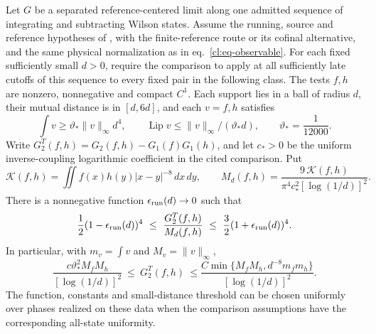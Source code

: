 \documentclass[11pt,letterpaper,reqno]{amsart}
\makeatletter
\numberwithin{equation}{section}
\renewcommand{\eqref}[1]{\textup{eq.~\ref{#1}}}
\theoremstyle{definition}
\newcommand{\ms@majorstart}{%
  \pushQED{\qed}\renewcommand{\qedsymbol}{$\blacksquare\square$}}
\newenvironment{corollary}[1][]{\ms@majorstart\ms@corollary[#1]}
  {\popQED\endms@corollary}
\theoremstyle{remark}
\makeatother
\begin{document}
\begin{corollary}[The closed physical shape law]
\label{cl:cor-shape-law}
Let \(G\) be a separated reference-centered limit along
one admitted sequence of integrating and subtracting Wilson
states. Assume the running, source and reference hypotheses of
\cite[Theorem~A and Corollaries~6.5 and~7.1]{FP}, with the
finite-reference route or its cofinal alternative, and the same
physical normalization as in \eqref{cl:eq-observable}.
For each fixed sufficiently small \(d>0\), require the comparison
to apply at all sufficiently late cutoffs of this sequence to
every fixed pair in the following class. The tests \(f,h\) are
nonzero, nonnegative and compact \(C^1\). Each support lies in a
ball of radius \(d\), their mutual distance is in \([d,6d]\), and
each \(v=f,h\) satisfies
\[
 \int v\ge\vartheta_*\|v\|_\infty d^4,\qquad
 \operatorname{Lip}v\le\|v\|_\infty/(\vartheta_*d),
 \qquad \vartheta_*=\frac1{12000}.
\]
Write \(G_2^T(f,h)=G_2(f,h)-G_1(f)G_1(h)\), and let \(c_*>0\)
be the uniform inverse-coupling logarithmic coefficient in the cited comparison.
Put
\[
 \mathcal K(f,h)=\iint f(x)h(y)|x-y|^{-8}\,dx\,dy,
 \qquad
 M_d(f,h)=\frac{9\,\mathcal K(f,h)}
                 {\pi^4 c_*^2[\log(1/d)]^2}.
\]
There is a nonnegative function \(\epsilon_{\rm run}(d)\to0\)
such that
\begin{equation}\label{cl:eq-shape-envelope}
 \frac12(1-\epsilon_{\rm run}(d))^4
 \ \le\ \frac{G_2^T(f,h)}{M_d(f,h)}
 \ \le\ \frac32(1+\epsilon_{\rm run}(d))^4 .
\end{equation}
In particular, with \(m_v=\int v\) and \(M_v=\|v\|_\infty\),
\begin{equation}\label{cl:eq-shape-size}
 \frac{c\vartheta_*^2M_fM_h}{[\log(1/d)]^2}
 \ \le\ G_2^T(f,h)\
 \le\frac{C\min\{M_fM_h,d^{-8}m_fm_h\}}{[\log(1/d)]^2}.
\end{equation}
The function, constants and small-distance threshold can be
chosen uniformly over phases realized on these data when the
comparison assumptions have the corresponding all-state
uniformity.
\end{corollary}
\end{document}
